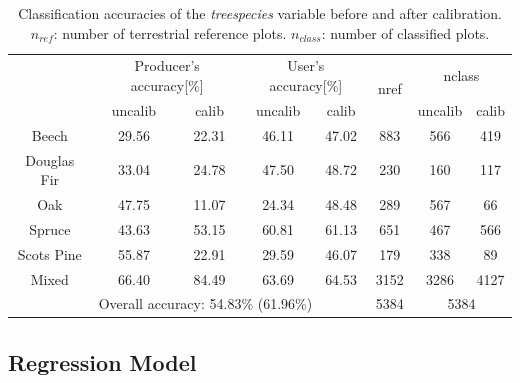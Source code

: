 \begin{table}[H]
	\begin{center}
	\caption{Classification accuracies of the \textit{treespecies} variable before and after calibration. $n_{ref}$: number of terrestrial reference plots. $n_{class}$: number of classified plots.}
	\vspace{0.2cm}
	\label{tab:classacc}
 {\small %
	\begin{tabular}{c|c|c|c|c|c|c|c} %
		\hlineB{1}
		\multirow{2}{*}{Main plot species} & \multicolumn{2}{c|}{Producer's accuracy[\%]} & \multicolumn{2}{c|}{User's accuracy[\%]} & \multirow{2}{*}{nref} & \multicolumn{2}{c}{nclass} \\ 
		\cline{2-3} \cline{4-5} \cline{7-8} & uncalib & calib & uncalib & calib & & uncalib & calib \\
		\hline \hline	
		 Beech       & 29.56 & 22.31 & 46.11 & 47.02 & 883 & 566 & 419 \\
		 Douglas Fir & 33.04 & 24.78 & 47.50 & 48.72 & 230 & 160 & 117 \\
		 Oak         & 47.75 & 11.07 & 24.34 & 48.48 & 289 & 567 & 66 \\
		 Spruce      & 43.63 & 53.15 & 60.81 & 61.13 & 651 & 467 & 566 \\
		 Scots Pine  & 55.87 & 22.91 & 29.59 & 46.07 & 179 & 338 & 89 \\
		 Mixed       & 66.40 & 84.49 & 63.69 & 64.53 & 3152 & 3286 & 4127 \\
		\hline
		 & \multicolumn{4}{l|}{Overall accuracy: 54.83\% (61.96\%)} & 5384 & \multicolumn{2}{c}{5384} \\
		 \hline \hline
	\end{tabular}
}%
	\end{center}
\end{table}



\subsection{Regression Model}
\label{sec:regmod}

%
%
%
%
%


